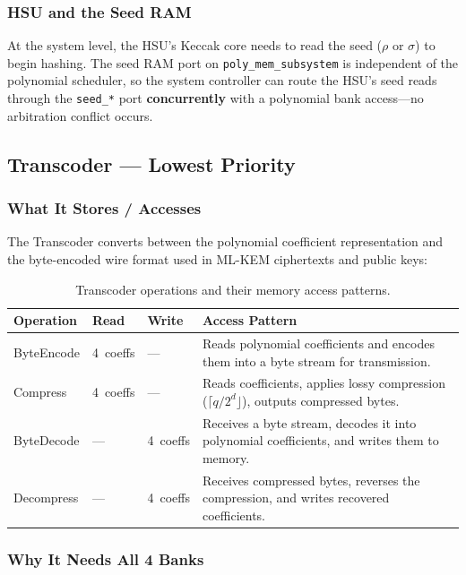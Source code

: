 \documentclass[11pt,letterpaper]{article}
\begin{document}
\subsubsection{HSU and the Seed RAM}

At the system level, the HSU's Keccak core needs to read the seed
($\rho$ or $\sigma$) to begin hashing. The seed RAM port on
\texttt{poly\_mem\_subsystem} is independent of the polynomial scheduler,
so the system controller can route the HSU's seed reads through the
\texttt{seed\_*} port \textbf{concurrently} with a polynomial bank
access---no arbitration conflict occurs.

\subsection{Transcoder — Lowest Priority}

\subsubsection{What It Stores / Accesses}

The Transcoder converts between the polynomial coefficient
representation and the byte-encoded wire format used in ML-KEM
ciphertexts and public keys:

\begin{table}[H]
\centering
\caption{Transcoder operations and their memory access patterns.}
\label{tab:tr_ops}
\begin{tabular}{@{}lllp{5.5cm}@{}}
\toprule
\textbf{Operation} & \textbf{Read} & \textbf{Write} &
\textbf{Access Pattern} \\
\midrule
ByteEncode & 4~coeffs & --- &
  Reads polynomial coefficients and encodes them into a byte
  stream for transmission. \\
Compress & 4~coeffs & --- &
  Reads coefficients, applies lossy compression
  ($\lceil q/2^d \rfloor$), outputs compressed bytes. \\
ByteDecode & --- & 4~coeffs &
  Receives a byte stream, decodes it into polynomial coefficients,
  and writes them to memory. \\
Decompress & --- & 4~coeffs &
  Receives compressed bytes, reverses the compression, and writes
  recovered coefficients. \\
\bottomrule
\end{tabular}
\end{table}

\subsubsection{Why It Needs All 4 Banks}
\end{document}
